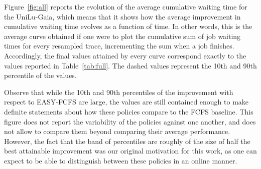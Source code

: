 \documentclass[sigconf,anonymous]{acmart}
\begin{document}
Figure~\ref{fig:all} reports the evolution of the average cumulative waiting
time for the UniLu-Gaia, which means that it shows how the
average improvement in cumulative waiting time evolves as a function of time.
In other words, this is the average curve obtained if one were to plot the
cumulative sum of job waiting times for every resampled trace, incrementing the
sum when a job finishes. Accordingly, the final values attained by every curve
correspond exactly to the values reported in Table~\ref{tab:full}. The dashed
values represent the 10th and 90th percentile of the values.

Observe that while the 10th and 90th percentiles of the improvement with
respect to EASY-FCFS are large, the values are still contained enough to make
definite statements about how these policies compare to the FCFS baseline.
This figure does not report the variability of the policies against one another,
and does not allow to compare them beyond comparing their average performance.
However, the fact that the band of percentiles are roughly of the size of half
the best attainable improvement was our original motivation for this work, as
one can expect to be able to distinguish between these policies in an
online manner.
\end{document}
